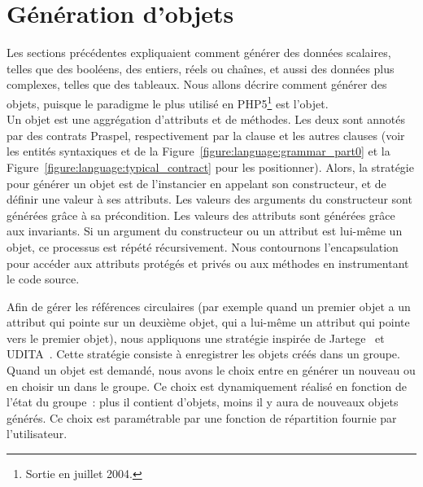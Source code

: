 \section{Génération d'objets}
\label{section:data:objects}

Les sections précédentes expliquaient comment générer des données scalaires,
telles que des booléens, des entiers, réels ou chaînes, et aussi des données
plus complexes, telles que des tableaux. Nous allons décrire comment générer des
objets, puisque le paradigme le plus utilisé en PHP5\footnote{Sortie en juillet
2004.} est l'objet. \\

Un objet est une aggrégation d'attributs et de méthodes. Les deux sont annotés
par des contrats Praspel, respectivement par la clause \ainvariant et les autres
clauses (voir les entités syntaxiques  et
 de la Figure~\ref{figure:language:grammar_part0} et la
Figure~\ref{figure:language:typical_contract} pour les positionner). Alors, la
stratégie pour générer un objet est de l'instancier en appelant son
constructeur, et de définir une valeur à ses attributs. Les valeurs des
arguments du constructeur sont générées grâce à sa précondition. Les valeurs des
attributs sont générées grâce aux invariants. Si un argument du constructeur ou
un attribut est lui-même un objet, ce processus est répété récursivement. Nous
contournons l'encapsulation pour accéder aux attributs protégés et privés ou aux
méthodes en instrumentant le code source.

Afin de gérer les références circulaires (par exemple quand un premier objet a
un attribut qui pointe sur un deuxième objet, qui a lui-même un attribut qui
pointe vers le premier objet), nous appliquons une stratégie inspirée de
Jartege~ et UDITA~. Cette stratégie
consiste à enregistrer les objets créés dans un groupe. Quand un objet est
demandé, nous avons le choix entre en générer un nouveau ou en choisir un dans
le groupe. Ce choix est dynamiquement réalisé en fonction de l'état du groupe~:
plus il contient d'objets, moins il y aura de nouveaux objets générés. Ce choix
est paramétrable par une fonction de répartition fournie par l'utilisateur.
